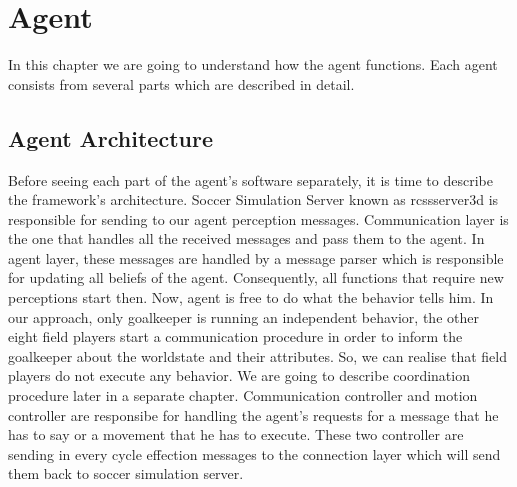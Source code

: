 \chapter{Agent}
In this chapter we are going to understand how the agent functions. Each agent consists from several parts which are described in detail.

\section{Agent Architecture}
Before seeing each part of the agent's software separately, it is time to describe the framework's architecture.  Soccer Simulation Server known as rcssserver3d is responsible for sending to our agent perception messages. Communication layer is the one that handles all the received messages and pass them to the agent. In agent layer, these messages are handled by a message parser which is responsible for updating all beliefs of the agent. Consequently, all functions that require new perceptions start then. Now, agent is free to do what the behavior tells him.
In our approach, only goalkeeper is running an independent behavior, the other eight field players start a communication procedure in order to inform the goalkeeper about the worldstate and their attributes. So, we can realise that field players do not execute any behavior. We are going to describe coordination procedure later in a separate chapter.
Communication controller and motion controller are responsibe for handling the agent's requests for a message that he has to say or a movement that he has to execute. These two controller are sending in every cycle effection messages to the connection layer which will send them back to soccer simulation server.\\

